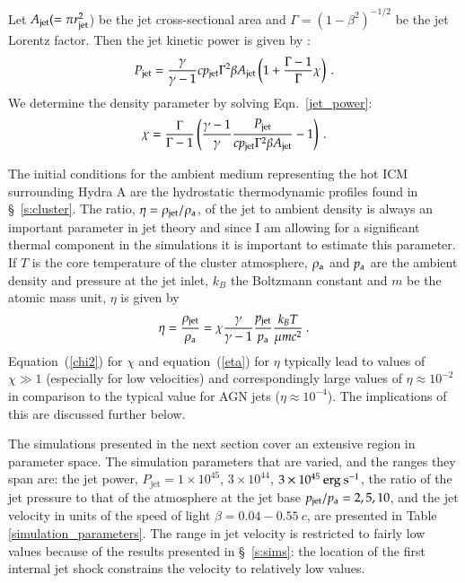 Let $A_{\rm{jet}}(=\pi r^2_{\rm{jet}}$) be the jet cross-sectional area and $\Gamma=(1-\beta^2)^{-1/2}$ be the jet Lorentz factor. Then the jet kinetic power is given by \citet{sutherland07}:
\begin{equation}
P_{\rm{jet}} = \frac{\gamma}{\gamma -1} c p_{\rm{jet}}\Gamma^2\beta A_\mathrm{jet}\left(1+\frac{\Gamma -1}{\Gamma}\chi\right)\:.
\label{jet_power}
\end{equation}
We determine the density parameter by solving Eqn.~\eqref{jet_power}:
\begin{equation}
\chi = \frac{\Gamma}{\Gamma -1}\left( \frac{\gamma-1}{\gamma}\frac{P_{\rm{jet}}}{c p_{\rm{jet}} \Gamma^2\beta A_{\rm{jet}}} -1 \right)\:.
\label{chi2}
\end{equation}

The initial conditions for the ambient medium representing the hot ICM surrounding Hydra A are the hydrostatic thermodynamic profiles found in \S~\ref{s:cluster}. The ratio, $\eta =\rho_{\rm jet}/\rho_{\rm  a}$, of the jet to ambient density is always an important parameter in jet theory and since I am allowing for a significant thermal component in the simulations it is important to estimate this parameter. If $T$ is the core temperature of the cluster atmosphere, $\rho_{\rm a}$ and $p_{\rm a}$ are the ambient density and pressure at the jet inlet, $k_B$ the Boltzmann constant and $m$ be the atomic mass unit, $\eta$ is given by 
\begin{equation}
\eta = \frac{\rho_{\rm{jet}}}{\rho_{\rm{a}}} = \chi \frac{\gamma}{\gamma-1}\frac{p_{\rm{jet}}}{p_{\rm{a}}}\frac{k_BT}{\mu m c^2}\:.
\label{eta}
\end{equation}
Equation~(\ref{chi2}) for $\chi$ and equation~(\ref{eta}) for $\eta$ typically lead to values of $\chi \gg 1$ (especially for low velocities) and correspondingly large values of $\eta \approx 10^{-2}$ in comparison to the typical value for AGN jets ($\eta \approx 10^{-4}$). The implications of this are discussed further below.

The simulations presented in the next section cover an extensive region in parameter space. The simulation parameters that are varied, and the ranges they span are: the jet power, $P_\mathrm{jet}=1\times10^{45}$, $3\times10^{44}$, $3\times10^{45} \> \rm erg \> s^{-1}$, the ratio of the jet pressure to that of the atmosphere at the jet base $p_{\rm{jet}}/p_{\rm{a}}=2, 5, 10$, and the jet velocity in units of the speed of light $\beta=0.04 - 0.55 \> c$, are presented in Table \ref{simulation_parameters}. The range in jet velocity is restricted to fairly low values because of the results presented in \S~\ref{s:sims}: the location of the first internal jet shock constrains the velocity to relatively low values. 

